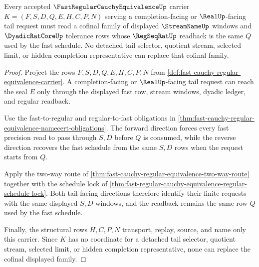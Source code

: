 \begin{theorem}
\label{thm:fast-regular-cauchy-equivalence-tail-window-cofinality}
Every accepted $\FastRegularCauchyEquivalenceUp$ carrier $K=(F,S,D,Q,E,H,C,P,N)$ serving a completion-facing or $\RealUp$-facing tail request must read a cofinal family of displayed $\StreamNameUp$ windows and $\DyadicRatCoreUp$ tolerance rows whose $\RegSeqRatUp$ readback is the same $Q$ used by the fast schedule. No detached tail selector, quotient stream, selected limit, or hidden completion representative can replace that cofinal family.
\end{theorem}
\begin{proof}
Project the rows $F,S,D,Q,E,H,C,P,N$ from \autoref{def:fast-cauchy-regular-equivalence-carrier}. A completion-facing or $\RealUp$-facing tail request can reach the seal $E$ only through the displayed fast row, stream windows, dyadic ledger, and regular readback.

Use the fast-to-regular and regular-to-fast obligations in \autoref{thm:fast-cauchy-regular-equivalence-namecert-obligations}. The forward direction forces every fast precision read to pass through $S,D$ before $Q$ is consumed, while the reverse direction recovers the fast schedule from the same $S,D$ rows when the request starts from $Q$.

Apply the two-way route of \autoref{thm:fast-cauchy-regular-equivalence-two-way-route} together with the schedule lock of \autoref{thm:fast-regular-cauchy-equivalence-regular-schedule-lock}. Both tail-facing directions therefore identify their finite requests with the same displayed $S,D$ windows, and the readback remains the same row $Q$ used by the fast schedule.

Finally, the structural rows $H,C,P,N$ transport, replay, source, and name only this carrier. Since $K$ has no coordinate for a detached tail selector, quotient stream, selected limit, or hidden completion representative, none can replace the cofinal displayed family.
\end{proof}



